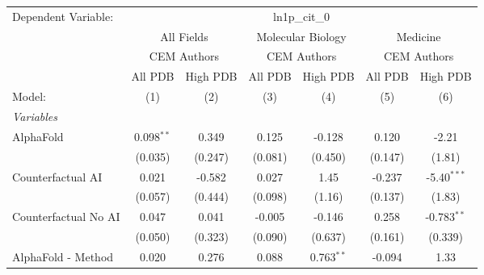 \begingroup
\centering
\begin{tabular}{lcccccc}
   \tabularnewline \midrule \midrule
   Dependent Variable: & \multicolumn{6}{c}{ln1p\_cit\_0}\\
 & \multicolumn{2}{c}{All Fields} & \multicolumn{2}{c}{Molecular Biology} & \multicolumn{2}{c}{Medicine} \\
\cmidrule(lr){2-3} \cmidrule(lr){4-5} \cmidrule(lr){6-7}
 & \multicolumn{2}{c}{CEM Authors} & \multicolumn{2}{c}{CEM Authors} & \multicolumn{2}{c}{CEM Authors} \\
\cmidrule(lr){2-3} \cmidrule(lr){4-5} \cmidrule(lr){6-7}
 & \multicolumn{1}{c}{All PDB} & \multicolumn{1}{c}{High PDB} & \multicolumn{1}{c}{All PDB} & \multicolumn{1}{c}{High PDB} & \multicolumn{1}{c}{All PDB} & \multicolumn{1}{c}{High PDB} \\
\cmidrule(lr){2-2} \cmidrule(lr){3-3} \cmidrule(lr){4-4} \cmidrule(lr){5-5} \cmidrule(lr){6-6} \cmidrule(lr){7-7}
   Model:                                                     & (1)            & (2)        & (3)           & (4)          & (5)            & (6)\\  
   \midrule
   \emph{Variables}\\
   AlphaFold                                                  & 0.098$^{**}$   & 0.349      & 0.125         & -0.128       & 0.120          & -2.21\\   
                                                              & (0.035)        & (0.247)    & (0.081)       & (0.450)      & (0.147)        & (1.81)\\   
   Counterfactual AI                                          & 0.021          & -0.582     & 0.027         & 1.45         & -0.237         & -5.40$^{***}$\\   
                                                              & (0.057)        & (0.444)    & (0.098)       & (1.16)       & (0.137)        & (1.83)\\   
   Counterfactual No AI                                       & 0.047          & 0.041      & -0.005        & -0.146       & 0.258          & -0.783$^{**}$\\   
                                                              & (0.050)        & (0.323)    & (0.090)       & (0.637)      & (0.161)        & (0.339)\\   
   AlphaFold - Method                                         & 0.020          & 0.276      & 0.088         & 0.763$^{**}$ & -0.094         & 1.33\\   

\end{tabular}
